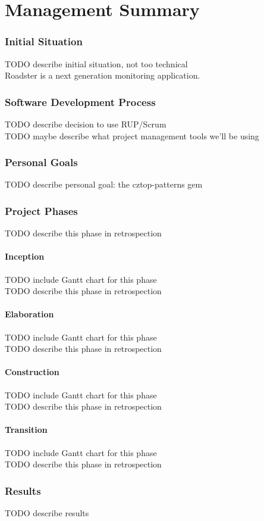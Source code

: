 \part*{Management Summary}\label{part:mgmtsummary}
\setcounter{secnumdepth}{0} %

\section*{Initial Situation}
TODO describe initial situation, not too technical\\

Roadster is a next generation monitoring application.

\section*{Software Development Process}
TODO describe decision to use RUP/Scrum\\
TODO maybe describe what project management tools we'll be using\\

\section*{Personal Goals}
TODO describe personal goal: the cztop-patterns gem\\

\section*{Project Phases}
TODO describe this phase in retrospection\\

\subsection*{Inception}
TODO include Gantt chart for this phase\\
TODO describe this phase in retrospection\\

\subsection*{Elaboration}
TODO include Gantt chart for this phase\\
TODO describe this phase in retrospection\\

\subsection*{Construction}
TODO include Gantt chart for this phase\\
TODO describe this phase in retrospection\\

\subsection*{Transition}
TODO include Gantt chart for this phase\\
TODO describe this phase in retrospection\\

\section*{Results}
TODO describe results\\
